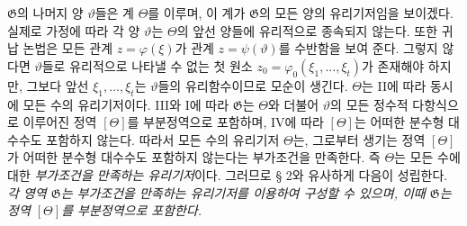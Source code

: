 
$\mathfrak G$의 나머지 양 $\vartheta$들은 계 $\Theta$를 이루며, 이 계가 $\mathfrak G$의 모든 양의 유리기저임을 보이겠다. 실제로 가정에 따라 각 양 $\vartheta$는 $\Theta$의 앞선 양들에 유리적으로 종속되지 않는다. 또한 귀납 논법은 모든 관계 $z=\varphi(\xi)$가 관계 $z=\psi(\vartheta)$를 수반함을 보여 준다. 그렇지 않다면 $\vartheta$들로 유리적으로 나타낼 수 없는 첫 원소 $z_0=\varphi_0(\xi_1,\ldots,\xi_t)$가 존재해야 하지만, 그보다 앞선 $\xi_1,\ldots,\xi_t$는 $\vartheta$들의 유리함수이므로 모순이 생긴다. $\Theta$는 II에 따라 동시에 모든 수의 유리기저이다. III와 I에 따라 $\mathfrak G$는 $\Theta$와 더불어 $\vartheta$의 모든 정수적 다항식으로 이루어진 정역 $[\Theta]$를 부분정역으로 포함하며, IV에 따라 $[\Theta]$는 어떠한 분수형 대수수도 포함하지 않는다. 따라서 모든 수의 유리기저 $\Theta$는, 그로부터 생기는 정역 $[\Theta]$가 어떠한 분수형 대수수도 포함하지 않는다는 부가조건을 만족한다. 즉 $\Theta$는 모든 수에 대한 \emph{부가조건을 만족하는 유리기저}이다. 그러므로 § 2와 유사하게 다음이 성립한다. \emph{각 영역 $\mathfrak G$는 부가조건을 만족하는 유리기저를 이용하여 구성할 수 있으며, 이때 $\mathfrak G$는 정역 $[\Theta]$를 부분정역으로 포함한다.}

